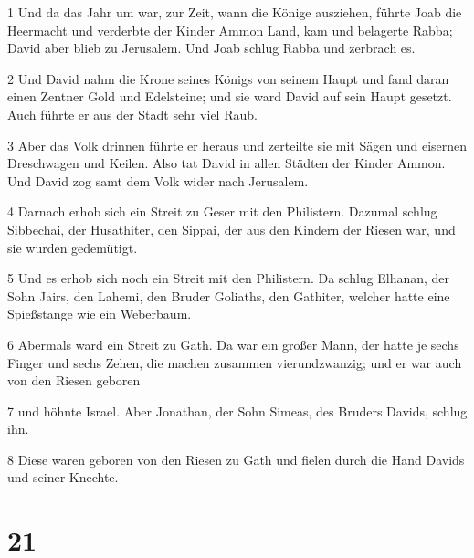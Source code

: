 \par 1 Und da das Jahr um war, zur Zeit, wann die Könige ausziehen, führte Joab die Heermacht und verderbte der Kinder Ammon Land, kam und belagerte Rabba; David aber blieb zu Jerusalem. Und Joab schlug Rabba und zerbrach es.
\par 2 Und David nahm die Krone seines Königs von seinem Haupt und fand daran einen Zentner Gold und Edelsteine; und sie ward David auf sein Haupt gesetzt. Auch führte er aus der Stadt sehr viel Raub.
\par 3 Aber das Volk drinnen führte er heraus und zerteilte sie mit Sägen und eisernen Dreschwagen und Keilen. Also tat David in allen Städten der Kinder Ammon. Und David zog samt dem Volk wider nach Jerusalem.
\par 4 Darnach erhob sich ein Streit zu Geser mit den Philistern. Dazumal schlug Sibbechai, der Husathiter, den Sippai, der aus den Kindern der Riesen war, und sie wurden gedemütigt.
\par 5 Und es erhob sich noch ein Streit mit den Philistern. Da schlug Elhanan, der Sohn Jairs, den Lahemi, den Bruder Goliaths, den Gathiter, welcher hatte eine Spießstange wie ein Weberbaum.
\par 6 Abermals ward ein Streit zu Gath. Da war ein großer Mann, der hatte je sechs Finger und sechs Zehen, die machen zusammen vierundzwanzig; und er war auch von den Riesen geboren
\par 7 und höhnte Israel. Aber Jonathan, der Sohn Simeas, des Bruders Davids, schlug ihn.
\par 8 Diese waren geboren von den Riesen zu Gath und fielen durch die Hand Davids und seiner Knechte.

\chapter{21}

